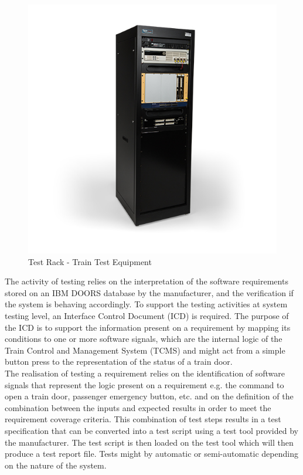 \begin{figure}[h]
    \centering
    \includegraphics[scale=0.5]{images/testrack.jpg}
    \caption{Test Rack - Train Test Equipment}
    \label{fig:test_rack}
\end{figure}

The activity of testing relies on the interpretation of the software requirements stored on an IBM DOORS database by the manufacturer, and the verification if the system is behaving accordingly. To support the testing activities at system testing level, an Interface Control Document (ICD) is required. The purpose of the ICD is to support the information present on a requirement by mapping its conditions to one or more software signals, which are the internal logic of the Train Control and Management System (TCMS) and might act from a simple button press to the representation of the status of a train door.\\

The realisation of testing a requirement relies on the identification of software signals that represent the logic present on a requirement e.g. the command to open a train door, passenger emergency button, etc. and on the definition of the combination between the inputs and expected results in order to meet the requirement coverage criteria. This combination of test steps results in a test specification that can be converted into a test script using a test tool provided by the manufacturer. The test script is then loaded on the test tool which will then produce a test report file. Tests might by automatic or semi-automatic depending on the nature of the system. 


